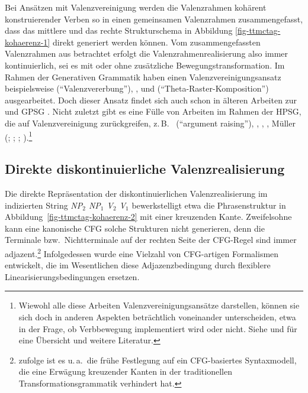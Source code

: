 Bei Ansätzen mit Valenzvereinigung werden die Valenzrahmen kohärent konstruierender Verben so in einen gemeinsamen Valenzrahmen zusammengefasst, dass das mittlere und das rechte Strukturschema in Abbildung \ref{fig-ttmctag-kohaerenz-1} direkt generiert werden können. Vom zusammengefassten Valenzrahmen aus betrachtet erfolgt die Valenzrahmenrealisierung also immer kontinuierlich, sei es mit oder ohne zusätzliche Bewegungstransformation. Im Rahmen der Generativen Grammatik haben einen Valenzvereinigungsansatz beispielsweise \cite{Jacobs:92} ("`Valenzvererbung"'), \citet[Abschnitt~9.6.2.2]{Haider:93}, \cite{Wurmbrand:01} und \citet[Kapitel~5]{Sternefeld:06} ("`Theta-Raster-Komposition"') ausgearbeitet. Doch dieser Ansatz findet sich auch schon in älteren Arbeiten zur  \citep{Geach:70,Steedman:85} und GPSG \citep{Johnson:86}. Nicht zuletzt gibt es eine Fülle von Arbeiten im Rahmen der HPSG, die auf Valenzvereinigung zurückgreifen, z.\,B.\ \cite{Hinrichs:Nakazawa:89,Hinrichs:Nakazawa:94} ("`argument raising"'), \cite{Nerbonne:94}, \cite{Pollard:96}, \cite{Meurers:99}, Müller (\citeyear[Kapitel~17--18]{Mueller:99}; \citeyear[Kapitel~2]{Mueller:02}; \citeyear{Mueller:05}; \citeyear{Mueller:09}).\footnote{Wiewohl alle diese Arbeiten Valenzvereinigungsansätze darstellen, können sie sich doch in anderen Aspekten beträchtlich voneinander unterscheiden, etwa in der Frage, ob Verbbewegung implementiert wird oder nicht. Siehe \cite{Meurers:99b} und \cite{Mueller:05} für eine Übersicht und weitere Literatur.}


\subsection{Direkte diskontinuierliche Valenzrealisierung} \label{sec-kohaerenz-strategien-direkt}

Die direkte Repräsentation der diskontinuierlichen Valenzrealisierung im indizierten String {\it NP$_2$ NP$_1$ V$_2$ V$_1$} bewerkstelligt etwa die Phrasenstruktur in Abbildung~\ref{fig-ttmctag-kohaerenz-2} mit einer kreuzenden Kante. Zweifelsohne kann eine kanonische CFG solche Strukturen nicht generieren, denn die Terminale bzw.\ Nichtterminale auf der rechten Seite der CFG-Regel sind immer adjazent.\footnote{\cite{McCawley:82} zufolge ist es u.\,a.\ die frühe Festlegung auf ein CFG-basiertes Syntaxmodell, die eine Erwägung kreuzender Kanten in der traditionellen Transformationsgrammatik verhindert hat.} Infolgedessen wurde eine Vielzahl von CFG-artigen Formalismen entwickelt, die im Wesentlichen diese Adjazenzbedingung durch flexiblere Linearisierungsbedingungen ersetzen.    

